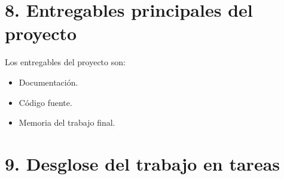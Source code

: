 \documentclass[
    11pt, %
]{charter}
\begin{document}
    \section{8. Entregables principales del proyecto}
    \label{sec:entregables}

    Los entregables del proyecto son:

    \begin{itemize}
    \item Documentación.
    \item Código fuente.
    \item Memoria del trabajo final.
    \end{itemize}

    \section{9. Desglose del trabajo en tareas}
    \label{sec:wbs}
\end{document}
